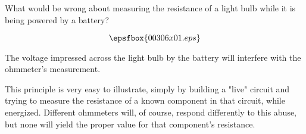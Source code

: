 

What would be wrong about measuring the resistance of a light bulb while it is being powered by a battery?

$$\epsfbox{00306x01.eps}$$







The voltage impressed across the light bulb by the battery will interfere with the ohmmeter's measurement.







This principle is very easy to illustrate, simply by building a "live" circuit and trying to measure the resistance of a known component in that circuit, while energized.  Different ohmmeters will, of course, respond differently to this abuse, but none will yield the proper value for that component's resistance.





